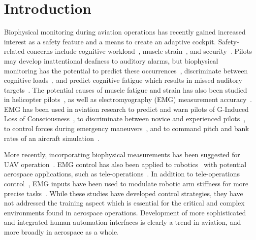 \section{Introduction}
\begin{mdframed}[hidealllines=true,backgroundcolor=blue!20]
	Biophysical monitoring during aviation operations has recently gained increased interest as a safety feature and a means to create an adaptive cockpit.
	Safety-related concerns include cognitive workload~\citep{RN1, RN2}, muscle strain~\citep{RN3, RN4, RN5}, and security~\citep{RN6}.
	Pilots may develop inattentional deafness to auditory alarms, but biophysical monitoring has the potential to predict these occurrences~\citep{RN7}, discriminate between cognitive loads~\citep{RN1}, and predict cognitive fatigue which results in missed auditory targets~\citep{RN2}.
	The potential causes of muscle fatigue and strain has also been studied in helicopter pilots~\citep{RN3, RN4, RN5}, as well as electromyography (EMG) measurement accuracy~\citep{RN8}.
	EMG has been used in aviation research to predict and warn pilots of G-Induced Loss of Consciousness~\citep{RN9, RN10}, to discriminate between novice and experienced pilots~\citep{RN11}, to control forces during emergency maneuvers~\citep{RN12}, and to command pitch and bank rates of an aircraft simulation~\citep{RN13}.

	More recently, incorporating biophysical measurements has been suggested for UAV operation~\citep{RN14}.
	EMG control has also been applied to robotics~\citep{RN15, RN16, RN17, RN18} with potential aerospace applications, such as tele-operations~\citep{RN19}.
	In addition to tele-operations control~\citep{RN20, RN21}, EMG inputs have been used to modulate robotic arm stiffness for more precise tasks~\citep{RN22, RN23}.
	While these studies have developed control strategies, they have not addressed the training aspect which is essential for the critical and complex environments found in aerospace operations.
	Development of more sophisticated and integrated human-automation interfaces is clearly a trend in aviation, and more broadly in aerospace as a whole.
\end{mdframed}

